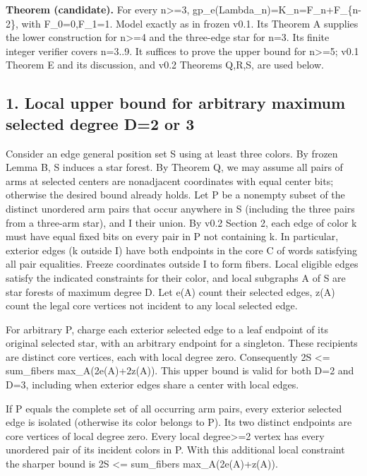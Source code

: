 \documentclass[
  10pt,
]{article}
\begin{document}
\textbf{Theorem (candidate).} For every n\textgreater=3,
gp\_e(Lambda\_n)=K\_n=F\_n+F\_\{n-2\}, with F\_0=0,F\_1=1. Model exactly
as in frozen v0.1. Its Theorem A supplies the lower construction for
n\textgreater=4 and the three-edge star for n=3. Its finite integer
verifier covers n=3..9. It suffices to prove the upper bound for
n\textgreater=5; v0.1 Theorem E and its discussion, and v0.2 Theorems
Q,R,S, are used below.

\subsection{1. Local upper bound for arbitrary maximum selected degree
D=2 or
3}\label{local-upper-bound-for-arbitrary-maximum-selected-degree-d2-or-3}

Consider an edge general position set S using at least three colors. By
frozen Lemma B, S induces a star forest. By Theorem Q, we may assume all
pairs of arms at selected centers are nonadjacent coordinates with equal
center bits; otherwise the desired bound already holds. Let P be a
nonempty subset of the distinct unordered arm pairs that occur anywhere
in S (including the three pairs from a three-arm star), and I their
union. By v0.2 Section 2, each edge of color k must have equal fixed
bits on every pair in P not containing k. In particular, exterior edges
(k outside I) have both endpoints in the core C of words satisfying all
pair equalities. Freeze coordinates outside I to form fibers. Local
eligible edges satisfy the indicated constraints for their color, and
local subgraphs A of S are star forests of maximum degree D. Let e(A)
count their selected edges, z(A) count the legal core vertices not
incident to any local selected edge.

For arbitrary P, charge each exterior selected edge to a leaf endpoint
of its original selected star, with an arbitrary endpoint for a
singleton. These recipients are distinct core vertices, each with local
degree zero. Consequently 2\textbar S\textbar{} \textless= sum\_fibers
max\_A(2e(A)+2z(A)). This upper bound is valid for both D=2 and D=3,
including when exterior edges share a center with local edges.

If P equals the complete set of all occurring arm pairs, every exterior
selected edge is isolated (otherwise its color belongs to P). Its two
distinct endpoints are core vertices of local degree zero. Every local
degree\textgreater=2 vertex has every unordered pair of its incident
colors in P. With this additional local constraint the sharper bound is
2\textbar S\textbar{} \textless= sum\_fibers max\_A(2e(A)+z(A)).
\end{document}
